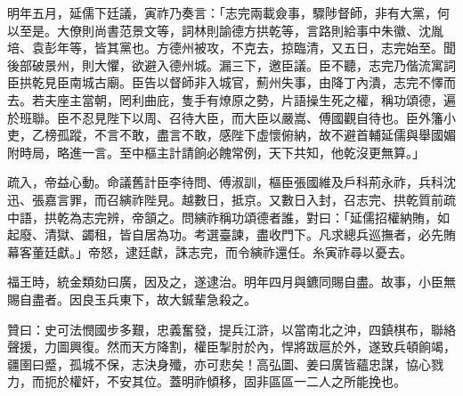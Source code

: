 \begin{pinyinscope}
明年五月，延儒下廷議，寅祚乃奏言：「志完兩載僉事，驟陟督師，非有大黨，何以至是。大僚則尚書范景文等，詞林則諭德方拱乾等，言路則給事中朱徽、沈胤培、袁彭年等，皆其黨也。方德州被攻，不克去，掠臨清，又五日，志完始至。聞後部破景州，則大懼，欲避入德州城。漏三下，邀臣議。臣不聽，志完乃偕流寓詞臣拱乾見臣南城古廟。臣告以督師非入城官，薊州失事，由降丁內潰，志完不懌而去。若夫座主當朝，罔利曲庇，隻手有燎原之勢，片語操生死之權，稱功頌德，遍於班聯。臣不忍見陛下以周、召待大臣，而大臣以嚴嵩、傅國觀自待也。臣外籓小吏，乙榜孤蹤，不言不敢，盡言不敢，感陛下虛懷俯納，故不避首輔延儒與舉國媚附時局，略進一言。至中樞主計請餉必餽常例，天下共知，他乾沒更無算。」

疏入，帝益心動。命議舊計臣李待問、傅淑訓，樞臣張國維及戶科荊永祚，兵科沈迅、張嘉言罪，而召縯祚陛見。越數日，抵京。又數日入封，召志完、拱乾質前疏中語，拱乾為志完辨，帝頷之。問縯祚稱功頌德者誰，對曰：「延儒招權納賄，如起廢、清獄、蠲租，皆自居為功。考選臺諫，盡收門下。凡求總兵巡撫者，必先賄幕客董廷獻。」帝怒，逮廷獻，誅志完，而令縯祚還任。糸寅祚尋以憂去。

福王時，統金類劾曰廣，因及之，遂逮治。明年四月與鑣同賜自盡。故事，小臣無賜自盡者。因良玉兵東下，故大鋮輩急殺之。

贊曰：史可法憫國步多艱，忠義奮發，提兵江滸，以當南北之沖，四鎮棋布，聯絡聲援，力圖興復。然而天方降割，權臣掣肘於內，悍將跋扈於外，遂致兵頓餉竭，疆圉曰蹙，孤城不保，志決身殲，亦可悲矣！高弘圖、姜曰廣皆蘊忠謀，協心戮力，而扼於權奸，不安其位。蓋明祚傾移，固非區區一二人之所能挽也。


\end{pinyinscope}